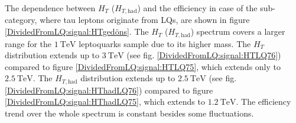 The dependence between $H_{T}$ ($H_{T,\text{had}}$) and the efficiency in case of the sub-category, where tau leptons originate from LQs, are shown in figure \ref{DividedFromLQ:signal:HTgedöns}. The $H_T$ ($H_{T,\text{had}}$) spectrum covers a larger range for the $\SI{1}{\tera\electronvolt}$ leptoquarks sample due to its higher mass. The $H_T$ distribution extends up to $\SI{3}{\tera\electronvolt}$ (see fig. \ref{DividedFromLQ:signal:HTLQ76}) compared to figure \ref{DividedFromLQ:signal:HTLQ75}, which extends only to $\SI{2.5}{\tera\electronvolt}$. The $H_{T,\text{had}}$ distribution extends up to $\SI{2.5}{\tera\electronvolt}$ (see fig. \ref{DividedFromLQ:signal:HThadLQ76}) compared to figure \ref{DividedFromLQ:signal:HThadLQ75}, which extends to $\SI{1.2}{\tera\electronvolt}$. The efficiency trend over the whole spectrum is constant besides some fluctuations.\newline
%
